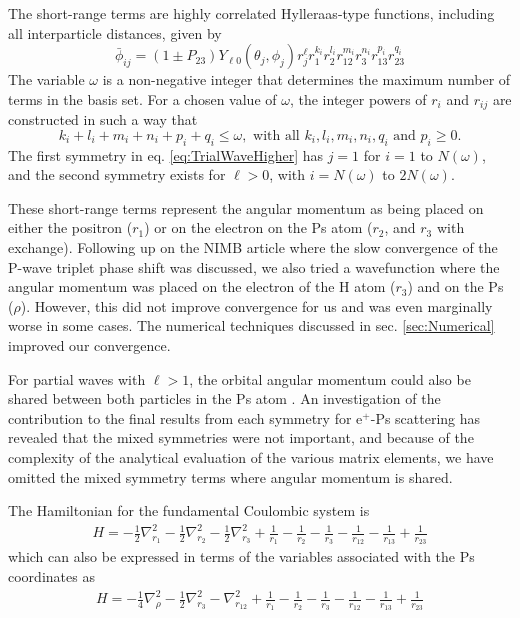 \documentclass[preprint,showpacs,preprintnumbers,amsmath,amssymb]{revtex4}
\begin{document}
The short-range terms are highly correlated Hylleraas-type functions, including all interparticle distances, given by
\begin{equation}
\label{eq:PhiDef}
\bar{\phi}_{ij} = \left(1 \pm P_{23}\right) Y_{\ell 0}(\theta_j,\phi_j) r_j^{\ell} r_1^{k_i} r_2^{l_i} r_{12}^{m_i} r_3^{n_i} r_{13}^{p_i} r_{23}^{q_i}
\end{equation}
The variable $\omega$ is a non-negative integer that determines the maximum number of terms in the basis set. For a chosen value of $\omega$, the integer powers of $r_i$ and $r_{ij}$ are constructed in such a way that 
\begin{equation}
k_i + l_i + m_i + n_i + p_i + q_i \leq \omega, \text{ with all } k_i, l_i, m_i, n_i, q_i \text{ and } p_i \geq 0.\end{equation}
The first symmetry in eq. \ref{eq:TrialWaveHigher} has $j=1$ for $i=1$ to $N(\omega)$, and the second symmetry exists for $\ell > 0$, with $i = N(\omega)$ to $2N(\omega)$.

These short-range terms represent the angular momentum as being placed on either the positron ($r_1$) or on the electron on the Ps atom ($r_2$, and $r_3$ with exchange). Following up on the NIMB article \cite{VanReeth2004} where the slow convergence of the P-wave triplet phase shift was discussed, we also tried a wavefunction where the angular momentum was placed on the electron of the H atom ($r_3$) and on the Ps ($\rho$). However, this did not improve convergence for us and was even marginally worse in some cases. The numerical techniques discussed in sec. \ref{sec:Numerical} improved our convergence.

For partial waves with $\ell>1$, the orbital angular momentum could also be shared between both particles in the Ps atom \cite{Schwartz1961a}. An investigation of the contribution to the final results from each symmetry for e$^+$-Ps scattering \cite{VanReeth1997} has revealed that the mixed symmetries were not important, and because of the complexity of the analytical evaluation of the various matrix elements, we have omitted the mixed symmetry terms where angular momentum is shared.

The Hamiltonian for the fundamental Coulombic system is
\begin{align}
H = -\frac{1}{2} \nabla_{r_1}^2 - \frac{1}{2} \nabla_{r_2}^2 - \frac{1}{2} \nabla_{r_3}^2 + \frac {1}{r_1}-\frac {1}{r_2}-\frac {1}{r_3}-\frac {1}{r_{12}}-\frac {1}{r_{13}}+\frac {1}{r_{23}}
	\label{eq:Hamiltonian1}
\end{align}
which can also be expressed in terms of the variables associated with the Ps coordinates as
\begin{align}
H = -\frac{1}{4} \nabla_{\rho}^2 - \frac{1}{2} \nabla_{r_3}^2 - \nabla_{r_{12}}^2 + \frac {1}{r_1}-\frac {1}{r_2}-\frac {1}{r_3}-\frac {1}{r_{12}}-\frac {1}{r_{13}}+\frac {1}{r_{23}}
	\label{eq:Hamiltonian2}
\end{align}
\end{document}
